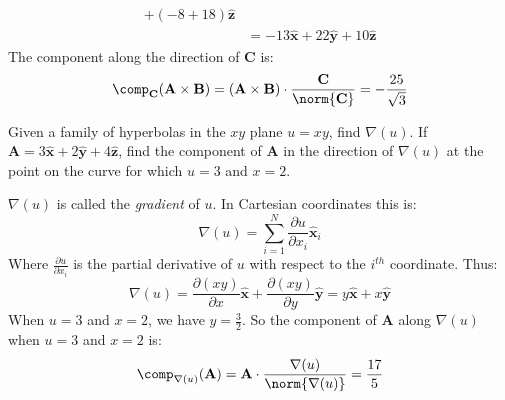 \documentclass[crop=false,class=book,oneside]{standalone}
\begin{document}
\begin{solution}
\begin{subequations}
\begin{align}
                        +(-8+18)\hat{\mathbf{z}}\\
                        &=
                        -13\hat{\mathbf{x}}
                        +22\hat{\mathbf{y}}
                        +10\hat{\mathbf{z}}
                    \end{align}
                \end{subequations}
                The component along the direction
                of $\mathbf{C}$ is:
                \begin{equation}
                    \comp_{\mathbf{C}}
                    (\mathbf{A}\times\mathbf{B})
                    =(\mathbf{A}\times\mathbf{B})\cdot
                        \frac{\mathbf{C}}{\norm{\mathbf{C}}}
                    =-\frac{25}{\sqrt{3}}
                \end{equation}
            \end{solution}
            \begin{problem}
                Given a family of hyperbolas in the $xy$
                plane $u=xy$, find $\nabla(u)$.
                If
                $\mathbf{A}%
                 =3\hat{\mathbf{x}}%
                 +2\hat{\mathbf{y}}%
                 +4\hat{\mathbf{z}}$,
                find the component of $\mathbf{A}$
                in the direction of $\nabla(u)$ at
                the point on the curve for which $u=3$ and $x=2$.
            \end{problem}
            \begin{solution}
                $\nabla(u)$ is called the
                \textit{gradient} of $u$.
                In Cartesian coordinates this is:
                \begin{equation}
                    \nabla(u)=\sum_{i=1}^{N}\frac{\partial u}
                        {\partial x_{i}}\hat{\mathbf{x}}_{i}
                \end{equation}
                Where $\frac{\partial u}{\partial x_{i}}$
                is the partial derivative
                of $u$ with respect to the $i^{th}$ coordinate.
                Thus:
                \begin{equation}
                    \nabla(u)
                    =\frac{\partial(xy)}
                          {\partial x}\hat{\mathbf{x}}
                    +\frac{\partial(xy)}
                          {\partial y}\hat{\mathbf{y}}
                    =y\hat{\mathbf{x}}+x\hat{\mathbf{y}}
                \end{equation}
                When $u=3$ and $x=2$, we have $y=\frac{3}{2}$.
                So the component of $\mathbf{A}$ along $\nabla(u)$
                when $u=3$ and $x=2$ is:
                \begin{equation}
                    \comp_{\nabla(u)}(\mathbf{A})
                    =\mathbf{A}\cdot
                        \frac{\nabla(u)}{\norm{\nabla(u)}}
                    =\frac{17}{5}
                \end{equation}
            \end{solution}
\end{document}
